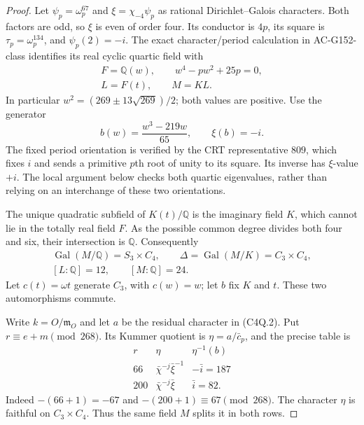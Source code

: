 \begin{proof}
Let $\psi_p=\omega_p^{67}$ and
$\xi=\chi_{-4}\psi_p$ as rational Dirichlet--Galois characters.
Both factors are odd, so $\xi$ is even of order four.
Its conductor is $4p$, its square is
$\tau_p=\omega_p^{134}$, and $\psi_p(2)=-i$.
The exact character/period calculation in AC-G152-class identifies
its real cyclic quartic field with
\[
 \begin{gathered}
 F=\mathbb Q(w),\qquad w^4-pw^2+25p=0,\\
 L=F(t),\qquad M=KL.
 \end{gathered}
 \tag{C4Q.4}
\]
In particular
$w^2=(269\pm13\sqrt{269})/2$; both values are positive.
Use the generator
\[
               b(w)=\frac{w^3-219w}{65},\qquad \xi(b)=-i.
 \tag{C4Q.5}
\]
The fixed period orientation is verified by the CRT representative
$809$, which fixes $i$ and sends a primitive $p$th root of unity
to its square.  Its inverse has $\xi$-value $+i$.
The local argument below checks both quartic eigenvalues, rather
than relying on an interchange of these two orientations.

The unique quadratic subfield of $K(t)/\mathbb Q$ is the imaginary
field $K$, which cannot lie in the totally real field $F$.
As the possible common degree divides both four and six, their
intersection is $\mathbb Q$.
Consequently
\[
 \begin{gathered}
 \operatorname{Gal}(M/\mathbb Q)=S_3\times C_4,\qquad
 \Delta=\operatorname{Gal}(M/K)=C_3\times C_4,\\
 [L:\mathbb Q]=12,\qquad[M:\mathbb Q]=24.
 \end{gathered}
 \tag{C4Q.6}
\]
Let $c(t)=\omega t$ generate $C_3$, with $c(w)=w$;
let $b$ fix $K$ and $t$.  These two automorphisms commute.

Write $k=O/\mathfrak m_O$ and let $a$ be the residual character
in (C4Q.2).  Put $r\equiv e+m\pmod{268}$.
Its Kummer quotient is $\eta=a/\bar c_p$, and the precise table is
\[
 \begin{array}{c|c|c}
 r&\eta&\eta^{-1}(b)\\ \hline
 66&\bar\chi^{-j}\bar\xi^{-1}&-\bar i=187\\
 200&\bar\chi^{-j}\bar\xi&\bar i=82.
 \end{array}
 \tag{C4Q.7}
\]
Indeed $-(66+1)=-67$ and $-(200+1)\equiv67\pmod{268}$.
The character $\eta$ is faithful on $C_3\times C_4$.
Thus the same field $M$ splits it in both rows.


\end{proof}
